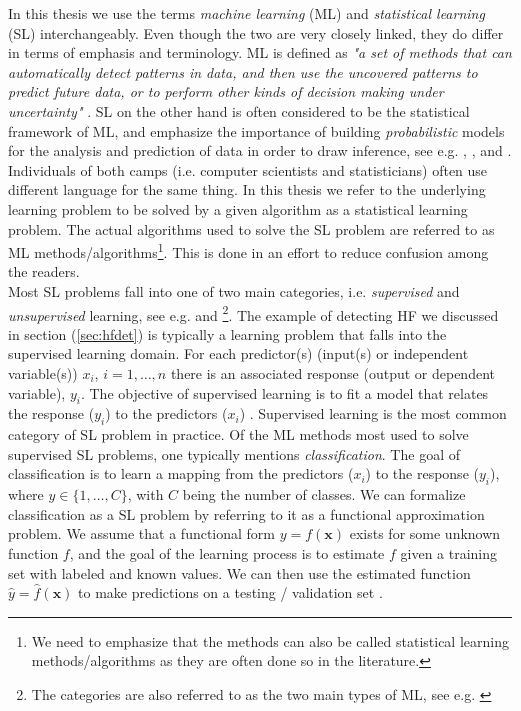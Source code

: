 \documentclass[../thesis.tex]{subfiles}
\begin{document}
\noindent In this thesis we use the terms \textit{machine learning} (ML) and \textit{statistical learning} (SL) interchangeably. Even though the two are very closely linked, they do differ in terms of emphasis and terminology. ML is defined as \textit{"a set of methods that can automatically detect patterns in data, and then use the uncovered patterns to predict future data, or to perform other kinds of decision making under uncertainty"} \citep{muphy2012machine}. SL on the other hand is often considered to be the statistical framework of ML, and emphasize the importance of building \textit{probabilistic} models for the analysis and prediction of data in order to draw inference, see e.g. \cite{friedman2009elements}, \cite{muphy2012machine}, \cite{james2013introduction} and \cite{wasserman2013all}. Individuals of both camps (i.e. computer scientists and statisticians) often use different language for the same thing. In this thesis we refer to the underlying learning problem to be solved by a given algorithm as a statistical learning problem. The actual algorithms used to solve the SL problem are referred to as ML methods/algorithms\footnote{We need to emphasize that the methods can also be called statistical learning methods/algorithms as they are often done so in the literature.}. This is done in an effort to reduce confusion among the readers.\\
\indent Most SL problems fall into one of two main categories, i.e. \textit{supervised} and \textit{unsupervised} learning, see e.g. \cite{friedman2009elements} and \cite{james2013introduction}\footnote{The categories are also referred to as the two main types of ML, see e.g. \cite{muphy2012machine}}. The example of detecting  HF we discussed in section (\ref{sec:hfdet}) is typically a learning problem that falls into the supervised learning domain. For each predictor(s) (input(s) or independent variable(s)) $x_i$, $i= 1,\hdots,n$ there is an associated response (output or dependent variable), $y_i$. The objective of supervised learning is to fit a model that relates the response ($y_i$) to the predictors ($x_i$) \citep{james2013introduction}. Supervised learning is the most common category of SL problem in practice. Of the ML methods most used to solve supervised SL problems, one typically mentions \textit{classification}. The goal of classification is to learn a mapping from the predictors ($x_i$) to the response ($y_i$), where $y \in \{ 1, \hdots, C\}$, with $C$ being the number of classes. We can formalize classification as a SL problem by referring to it as a functional approximation problem. We assume that a functional form $y = f(\mathbf{x})$ exists for some unknown function $f$, and the goal of the learning process is to estimate $f$ given a training set with labeled and known values. We can then use the estimated function $\hat{y} = \hat{f} (\mathbf{x})$ to make predictions on a testing / validation set \citep{muphy2012machine}.\\
\end{document}
